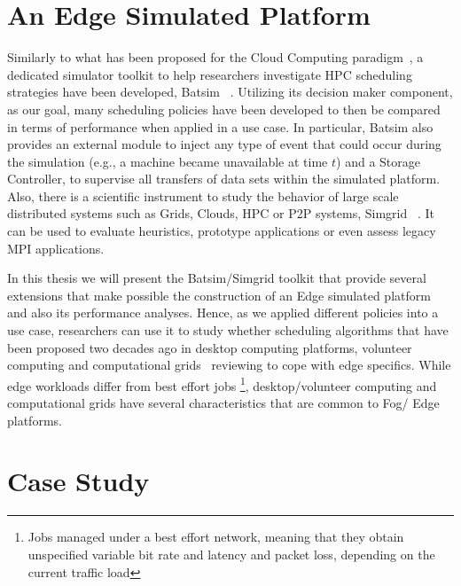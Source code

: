 \section{An Edge Simulated Platform}

Similarly to what has been proposed for the Cloud Computing paradigm~\cite{vmplaces:tpds}, a dedicated simulator toolkit to help researchers investigate HPC scheduling strategies have been developed, Batsim ~\cite{batsim}. Utilizing its decision maker component, as our goal, many scheduling policies have been developed to then be compared in terms of performance when applied in a use case. In particular, Batsim also provides an external module to inject any type of event that could occur during the simulation (e.g., a machine became unavailable at time $t$) and a Storage Controller, to supervise all transfers of data sets within the simulated platform. Also, there is a scientific instrument to study the behavior of large scale distributed systems such as Grids, Clouds, HPC or P2P systems, Simgrid ~\cite{simgrid}. It can be used to evaluate heuristics, prototype applications or even assess legacy MPI applications.

In this thesis we will present the Batsim/Simgrid toolkit that provide several extensions that make possible the construction of an Edge simulated platform and also its performance analyses. Hence, as we applied different policies into a use case, researchers can use it to study whether scheduling algorithms that have been proposed two decades ago in desktop computing platforms, volunteer computing and computational grids~\cite{anderson2004boinc, allcock2002data, volunteer_computing} reviewing to cope with edge specifics.
While edge workloads differ from best effort jobs \footnote{Jobs managed under a best effort network, meaning that they obtain unspecified variable bit rate and latency and packet loss, depending on the current traffic load}, desktop/volunteer computing and computational grids have several characteristics that are common to Fog/ Edge platforms.


\section{Case Study}

